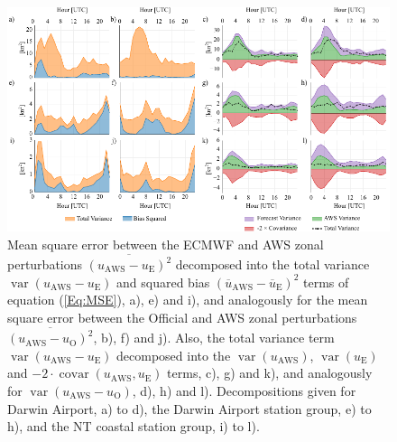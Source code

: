\documentclass[twocol]{ametsoc}
\DeclareMathOperator{\covar}{covar}
\DeclareMathOperator{\var}{var}
\begin{document}
\begin{figure}
\centering
\includegraphics[width=39pc]{error_decomp.pdf}
\caption{Mean square error between the ECMWF and AWS zonal perturbations $\overline{\left(u_\text{AWS} - u_\text{E}\right)^2}$ decomposed into the total variance $\var\left(u_\text{AWS} - u_\text{E}\right)$ and squared bias $\left(\overline{u}_\text{AWS} - \overline{u}_\text{E}\right)^2$ terms of equation (\ref{Eq:MSE}), a), e) and i), and analogously for the mean square error between the Official and AWS zonal perturbations $\overline{\left(u_\text{AWS} - u_\text{O}\right)^2}$, b), f) and j). Also, the total variance term $\var\left(u_\text{AWS} - u_\text{E}\right)$ decomposed into the $\var\left(u_\text{AWS}\right)$, $\var\left(u_\text{E}\right)$ and  $- 2 \cdot \covar\left(u_\text{AWS}, u_\text{E}\right)$ terms, c), g) and k), and analogously for $\var\left(u_\text{AWS} - u_\text{O}\right)$, d), h) and l). Decompositions given for Darwin Airport, a) to d), the Darwin Airport station group, e) to h), and the NT coastal station group, i) to l).}
\label{Fig:error_decomp}
\end{figure}
\end{document}
